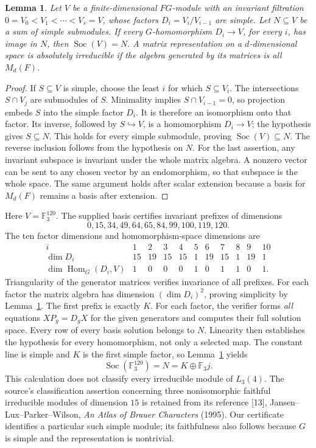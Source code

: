 \documentclass[11pt,a4paper]{article}
\newtheorem{lemma}{Lemma}
\newcommand{\Soc}{\operatorname{Soc}}
\begin{document}
\begin{lemma}\label{lem:socle}
Let $V$ be a finite-dimensional $FG$-module with an invariant filtration
$0=V_0<V_1<\cdots<V_s=V$, whose factors $D_i=V_i/V_{i-1}$ are simple.
Let $N\subseteq V$ be a sum of simple submodules. If every $G$-homomorphism
$D_i\to V$, for every $i$, has image in $N$, then $\Soc(V)=N$.
A matrix representation on a $d$-dimensional space is absolutely irreducible
if the algebra generated by its matrices is all $M_d(F)$.
\end{lemma}
\begin{proof}
If $S\subseteq V$ is simple, choose the least $i$ for which $S\subseteq V_i$.
The intersections $S\cap V_j$ are submodules of $S$. Minimality implies
$S\cap V_{i-1}=0$, so projection embeds $S$ into the simple factor $D_i$.
It is therefore an isomorphism onto that factor. Its inverse, followed by
$S\hookrightarrow V$, is a homomorphism $D_i\to V$; the hypothesis gives
$S\subseteq N$. This holds for every simple submodule, proving
$\Soc(V)\subseteq N$. The reverse inclusion follows from the hypothesis on $N$.
For the last assertion, any invariant subspace is invariant under the whole
matrix algebra. A nonzero vector can be sent to any chosen vector by an
endomorphism, so that subspace is the whole space. The same argument holds
after scalar extension because a basis for $M_d(F)$ remains a basis after
extension.
\end{proof}

Here $V=\mathbb F_3^{120}$. The supplied basis certifies invariant prefixes
of dimensions
\[
0,15,34,49,64,65,84,99,100,119,120.
\]
The ten factor dimensions and homomorphism-space dimensions are
\[
\begin{array}{c|rrrrrrrrrr}
i&1&2&3&4&5&6&7&8&9&10\\\hline
\dim D_i&15&19&15&15&1&19&15&1&19&1\\
\dim\operatorname{Hom}_G(D_i,V)&1&0&0&0&1&0&1&1&0&1.
\end{array}
\]
Triangularity of the generator matrices verifies invariance of all prefixes.
For each factor the matrix algebra has dimension $(\dim D_i)^2$, proving
simplicity by Lemma~\ref{lem:socle}. The first prefix is exactly $K$.
For each factor, the verifier forms \emph{all} equations
$XP_g=D_gX$ for the given generators and computes their full solution space.
Every row of every basis solution belongs to $N$. Linearity then establishes
the hypothesis for every homomorphism, not only a selected map.
The constant line is simple and $K$ is the first simple factor, so
Lemma~\ref{lem:socle} yields
\[
 \Soc(\mathbb F_3^{120})=N=K\oplus\mathbb F_3j.
\]
This calculation does not classify every irreducible module of $L_3(4)$.
The source's classification assertion concerning three nonisomorphic faithful
irreducible modules of dimension $15$ is retained from its reference [13], Jansen--Lux--Parker--Wilson, \emph{An Atlas of Brauer Characters} (1995).
Our certificate identifies a particular such simple module; its faithfulness
also follows because $G$ is simple and the representation is nontrivial.
\end{document}
